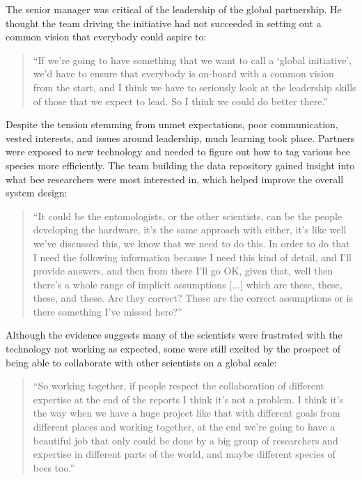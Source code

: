 The senior manager was critical of the leadership of the global partnership. He thought the team driving the initiative had not succeeded in setting out a common vision that everybody could aspire to:

\begin{quote}
\small
\enquote{If we're going to have something that we want to call a \enquote{global initiative}, we'd have to ensure that everybody is on-board with a common vision from the start, and I think we have to seriously look at the leadership skills of those that we expect to lead. So I think we could do better there.} \\
\end{quote}

Despite the tension stemming from unmet expectations, poor communication, vested interests, and issues around leadership, much learning took place. Partners were exposed to new technology and needed to figure out how to tag various bee species more efficiently. The team building the data repository gained insight into what bee researchers were most interested in, which helped improve the overall system design:

\begin{quote}
\small
\enquote{It could be the entomologists, or the other scientists, can be the people developing the hardware, it's the same approach with either, it's like well we've discussed this, we know that we need to do this. In order to do that I need the following information because I need this kind of detail, and I'll provide answers, and then from there I'll go OK, given that, well then there’s a whole range of implicit assumptions [...] which are these, these, these, and these. Are they correct?  These are the correct assumptions or is there something I've missed here?} \\
\end{quote}

Although the evidence suggests many of the scientists were frustrated with the technology not working as expected, some were still excited by the prospect of being able to collaborate with other scientists on a global scale: 

\begin{quote}
\small
\enquote{So working together, if people respect the collaboration of different expertise at the end of the reports I think it's not a problem.  I think it's the way when we have a huge project like that with different goals from different places and working together, at the end we're going to have a beautiful job that only could be done by a big group of researchers and expertise in different parts of the world, and maybe different species of bees too.} \\
\end{quote}

